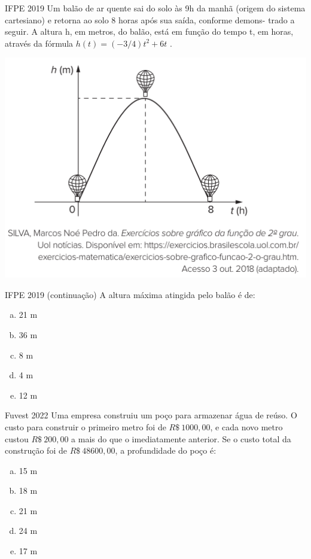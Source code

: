 \documentclass[11pt]{beamer}
\begin{document}
\begin{frame}{IFPE 2019}
    Um balão de ar quente sai do solo às 9h da manhã (origem do sistema cartesiano) e retorna ao solo 8 horas após sua saída, conforme demons- trado a seguir. A altura h, em metros, do balão, está em função do tempo t, em horas, através da fórmula $h(t)=(-{3}/{4})t^{2}+6t$ .

    \begin{center}
        \includegraphics[scale=0.5]{imagens/IFPE 2019.png}
    \end{center}
\end{frame}

\begin{frame}{IFPE 2019 (continuação)}
    A altura máxima atingida pelo balão é de:

    \begin{enumerate}[a)]
        \item 21 m %
        \item 36 m
        \item 8 m 
        \item 4 m
        \item 12 m
    \end{enumerate}
\end{frame}

\begin{frame}{Fuvest 2022}
    Uma empresa construiu um poço para armazenar água de reúso. O custo para construir o primeiro metro foi de $R\$\ 1 000,00$, e cada novo metro custou $R\$\ 200,00$ a mais do que o imediatamente anterior. Se o custo total da construção foi de $R\$\ 48 600,00$, a profundidade do poço é:

    \begin{enumerate}[a)]
        \item 15 m
        \item 18 m %
        \item 21 m
        \item 24 m
        \item 17 m
    \end{enumerate}
\end{frame}
\end{document}
